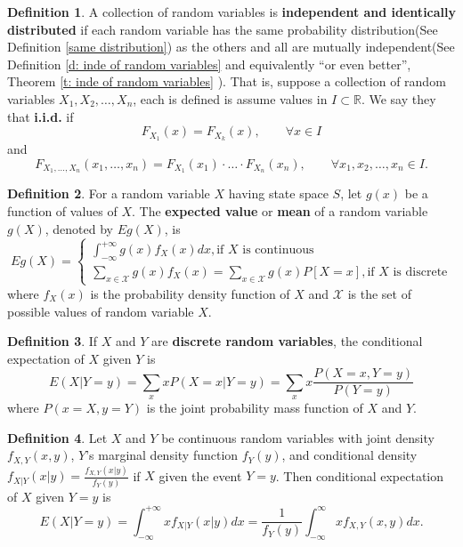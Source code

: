 \documentclass[11pt,a4paper]{amsart}
\theoremstyle{plain}
\theoremstyle{definition}
\newtheorem{definition}{Definition}
\begin{document}
	\begin{definition}
		A collection of random variables is \textbf{independent and identically distributed} if each random variable has the same probability distribution(See Definition \ref{same distribution}) as the others and all are mutually independent(See Definition \ref{d: inde of random variables} and equivalently ``or even better'', Theorem \ref{t: inde of random variables} ). That is, suppose a collection of random variables $X_{1}, X_{2}, \dots, X_{n}$, each is defined is assume values in $I \subset \mathbb{R}$. We say they that \textbf{i.i.d.} if 
		\[	F_{X_{1}}(x) = F_{X_{k}}(x), \qquad \forall x \in I	\]
		and 
		\[	F_{X_{1}, \dots , X_{n}}(x_{1}, \dots, x_{n}) = F_{X_{1}}(x_{1}) \cdot \dots \cdot F_{X_{n}}(x_{n}), \qquad \forall x_{1}, x_{2}, \dots, x_{n} \in I. 	\]
	\end{definition}
	
	\begin{definition}
		For a random variable $X$ having state space $S$, let $g(x)$ be a function of values of $X$. The \textbf{expected value} or \textbf{mean} of a random variable $g(X)$, denoted by $E g(X)$, is 
		\[ E g(X) = \begin{cases}
		\int_{-\infty}^{+\infty} g(x)f_{X}(x) dx,	\text{if $X$ is continuous}\\
		\sum_{x \in \mathscr{X}} g(x)f_{X}(x) = \sum_{x \in \mathscr{X}} g(x)P[X = x],	\text{if $X$ is discrete}
		\end{cases}
		\]
		where $f_{X}(x)$ is the probability density function of $X$ and $\mathscr{X}$ is the set of possible values of random variable $X$.
	\end{definition}

		\begin{definition}
		If $X$ and $Y$ are \textbf{discrete random variables}, the conditional expectation of $X$ given $Y$ is 
		\[	E(X | Y = y) = \sum_{x} xP(X = x | Y = y) = \sum_{x} x \frac{P(X = x, Y = y)}{P(Y = y)}	\]
		where $P(x = X, y = Y)$ is the joint probability mass function of $X$ and $Y$.
	\end{definition}
	
	\begin{definition}
		Let $X$ and $Y$ be continuous random variables with joint density $f_{X,Y}(x,y)$, $Y$'s marginal density function $f_{Y}(y)$, and conditional density $f_{X|Y}(x|y) = \frac{f_{X,Y}(x|y)}{f_{Y}(y)}$ if $X$ given the event $Y = y$. Then conditional expectation of $X$ given $Y = y$ is 
		\[	E(X | Y = y) = \int_{-\infty}^{+\infty} x f_{X|Y}(x|y)dx = \frac{1}{f_{Y}(y)} \int_{-\infty}^{\infty} x f_{X,Y}(x,y)dx.	\]
	\end{definition}
	
\end{document}
